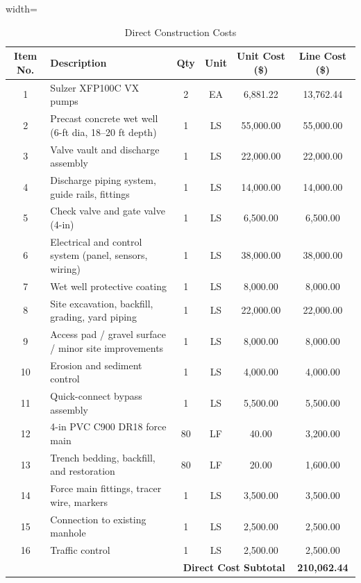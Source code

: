\begin{table}[H]
\centering
\caption{Direct Construction Costs}
\label{tab:direct_costs}
\begin{adjustbox}{width=\textwidth}
\begin{tabular}{c l c c c c}
\toprule
\textbf{Item No.} & \textbf{Description} & \textbf{Qty} & \textbf{Unit} & \textbf{Unit Cost (\$)} & \textbf{Line Cost (\$)} \\
\midrule
1  & Sulzer XFP100C VX pumps & 2 & EA & 6,881.22 & 13,762.44 \\
2  & Precast concrete wet well (6-ft dia, 18–20 ft depth) & 1 & LS & 55,000.00 & 55,000.00 \\
3  & Valve vault and discharge assembly & 1 & LS & 22,000.00 & 22,000.00 \\
4  & Discharge piping system, guide rails, fittings & 1 & LS & 14,000.00 & 14,000.00 \\
5  & Check valve and gate valve (4-in) & 1 & LS & 6,500.00 & 6,500.00 \\
6  & Electrical and control system (panel, sensors, wiring) & 1 & LS & 38,000.00 & 38,000.00 \\
7  & Wet well protective coating & 1 & LS & 8,000.00 & 8,000.00 \\
8  & Site excavation, backfill, grading, yard piping & 1 & LS & 22,000.00 & 22,000.00 \\
9  & Access pad / gravel surface / minor site improvements & 1 & LS & 8,000.00 & 8,000.00 \\
10 & Erosion and sediment control & 1 & LS & 4,000.00 & 4,000.00 \\
11 & Quick-connect bypass assembly & 1 & LS & 5,500.00 & 5,500.00 \\
12 & 4-in PVC C900 DR18 force main & 80 & LF & 40.00 & 3,200.00 \\
13 & Trench bedding, backfill, and restoration & 80 & LF & 20.00 & 1,600.00 \\
14 & Force main fittings, tracer wire, markers & 1 & LS & 3,500.00 & 3,500.00 \\
15 & Connection to existing manhole & 1 & LS & 2,500.00 & 2,500.00 \\
16 & Traffic control & 1 & LS & 2,500.00 & 2,500.00 \\
\midrule
\multicolumn{5}{r}{\textbf{Direct Cost Subtotal}} & \textbf{210,062.44} \\
\bottomrule
\end{tabular}
\end{adjustbox}
\end{table}

